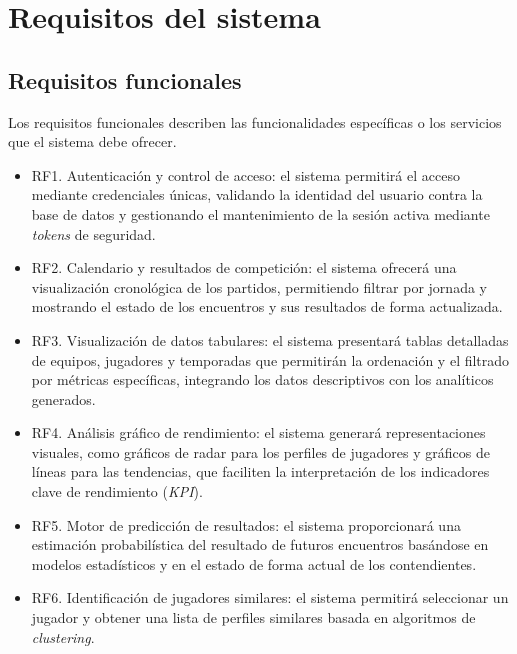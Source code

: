 \section{Requisitos del sistema}

\subsection{Requisitos funcionales}

Los requisitos funcionales describen las funcionalidades específicas o los servicios que el sistema debe ofrecer.

\begin{itemize}

    \item RF1. Autenticación y control de acceso: el sistema permitirá el acceso mediante credenciales únicas, validando la identidad del usuario contra la base de datos y gestionando el mantenimiento de la sesión activa mediante \textit{tokens} de seguridad.

    \item RF2. Calendario y resultados de competición: el sistema ofrecerá una visualización cronológica de los partidos, permitiendo filtrar por jornada y mostrando el estado de los encuentros y sus resultados de forma actualizada.

    \item RF3. Visualización de datos tabulares: el sistema presentará tablas detalladas de equipos, jugadores y temporadas que permitirán la ordenación y el filtrado por métricas específicas, integrando los datos descriptivos con los analíticos generados.

    \item RF4. Análisis gráfico de rendimiento: el sistema generará representaciones visuales, como gráficos de radar para los perfiles de jugadores y gráficos de líneas para las tendencias, que faciliten la interpretación de los indicadores clave de rendimiento (\textit{KPI}).

    \item RF5. Motor de predicción de resultados: el sistema proporcionará una estimación probabilística del resultado de futuros encuentros basándose en modelos estadísticos y en el estado de forma actual de los contendientes.

    \item RF6. Identificación de jugadores similares: el sistema permitirá seleccionar un jugador y obtener una lista de perfiles similares basada en algoritmos de \textit{clustering}.


\end{itemize}
